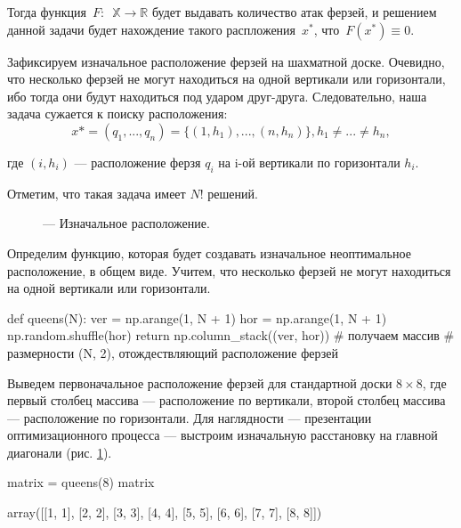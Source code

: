 Тогда  функция~$F:$~$\mathbb{X} \to \mathbb{R}$ будет выдавать количество атак ферзей, и решением данной задачи будет нахождение такого распложения~$x^{*}$, что~$F(x^*) \equiv 0$.

Зафиксируем изначальное расположение ферзей на шахматной доске. Очевидно, что несколько ферзей не могут находиться на одной вертикали или горизонтали, ибо тогда они будут находиться под ударом друг-друга. Следовательно, наша задача сужается к поиску расположения:
\begin{equation}
x* = (q_1, ..., q_n) = \{(1, h_1), ..., (n, h_n)\}, h_1 \neq ...  \neq h_n,
\end{equation}

где $(i, h_i)$ — расположение ферзя $q_i$ на i-ой вертикали по горизонтали $h_i$.

Отметим, что такая задача имеет $N!$ решений.

\newgame
{}

\begin{figure}[h!]
	\begin{center}
		\showboard
		\legend{}
		\caption{ --- Изначальное расположение.}
		\label{img:nonopt}
	\end{center}
\end{figure}

Определим функцию, которая будет создавать изначальное неоптимальное расположение, в общем виде. Учитем, что несколько ферзей не могут находиться на одной вертикали или горизонтали.

\begin{pyin}
def queens(N):
  ver = np.arange(1, N + 1)
  hor = np.arange(1, N + 1)
  np.random.shuffle(hor)
  return np.column_stack((ver, hor)) # получаем массив
  # размерности (N, 2), отождествляющий расположение ферзей
\end{pyin}

Выведем первоначальное расположение ферзей для стандартной доски $8 \times 8$, где первый столбец массива — расположение по вертикали, второй столбец массива — расположение по горизонтали. Для наглядности — презентации оптимизационного процесса — выстроим изначальную расстановку на главной диагонали (рис. \ref{img:nonopt}).


\begin{pyin}
matrix = queens(8)
matrix
\end{pyin}

\begin{pyout}
array([[1, 1],
       [2, 2],
       [3, 3],
       [4, 4],
       [5, 5],
       [6, 6],
       [7, 7],
       [8, 8]])
\end{pyout}


